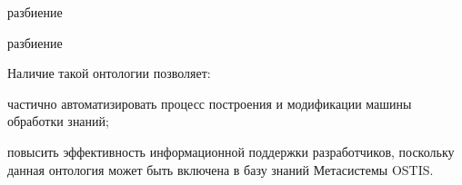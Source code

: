 \begin{SCn}
\begin{scnreltoset}{разбиение}
\end{scnreltoset}

\begin{scnreltoset}{разбиение}
\end{scnreltoset}
\end{SCn}

Наличие такой онтологии позволяет:
\begin{textitemize}
    \item частично автоматизировать процесс построения и модификации машины обработки знаний;
    \item повысить эффективность информационной поддержки разработчиков, поскольку данная онтология может быть включена в базу знаний Метасистемы OSTIS.
\end{textitemize}

